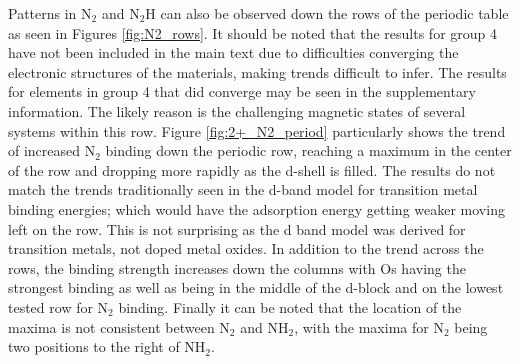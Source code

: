 Patterns in N$_2$ and N$_2$H can also be observed down the rows of the periodic table as seen in Figures \ref{fig:N2_rows}. It should be noted that the results for group 4 have not been included in the main text due to difficulties converging the electronic structures of the materials, making trends difficult to infer. The results for elements in group 4 that did converge may be seen in the supplementary information. The likely reason is the challenging magnetic states of several systems within this row. Figure \ref{fig:2+_N2_period} particularly shows the trend of increased N$_2$ binding down the periodic row, reaching a maximum in the center of the row and dropping more rapidly as the d-shell is filled. The results do not match the trends traditionally seen in the d-band model\cite{Nilsson_2008} for transition metal binding energies; which would have the adsorption energy getting weaker moving left on the row. This is not surprising as the d band model was derived for transition metals, not doped metal oxides. In addition to the trend across the rows, the binding strength increases down the columns with Os having the strongest binding as well as being in the middle of the d-block and on the lowest tested row for N$_2$ binding. Finally it can be noted that the location of the maxima is not consistent between N$_2$ and NH$_2$, with the maxima for N$_2$ being two positions to the right of NH$_2$.

